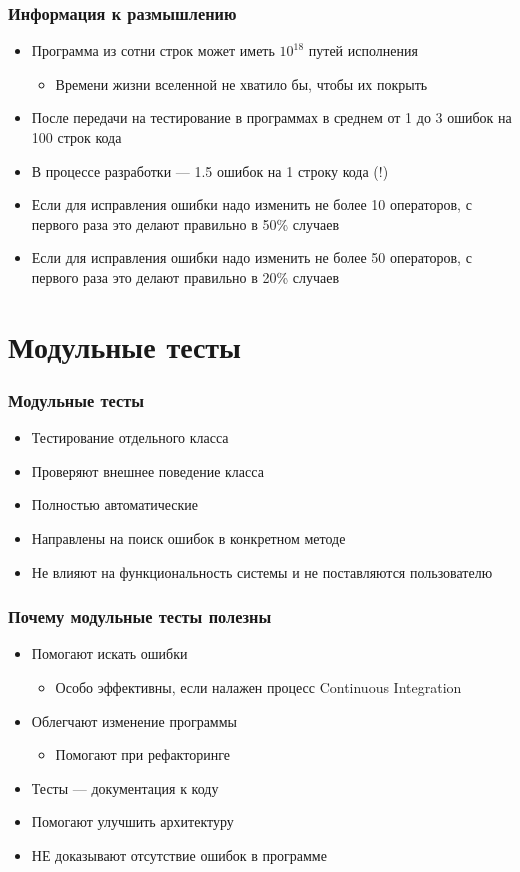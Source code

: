 \documentclass[xetex,mathserif,serif]{beamer}
\begin{document}
	\begin{frame}
		\frametitle{Информация к размышлению}
		\begin{itemize}
			\item Программа из сотни строк может иметь $10^{18}$ путей исполнения
			\begin{itemize}
				\item Времени жизни вселенной не хватило бы, чтобы их покрыть
			\end{itemize}
			\item После передачи на тестирование в программах в среднем от 1 до 3 ошибок на 100 строк кода
			\item В процессе разработки --- 1.5 ошибок на 1 строку кода (!)
			\item Если для исправления ошибки надо изменить не более 10 операторов, с первого раза это делают правильно в 50\% случаев
			\item Если для исправления ошибки надо изменить не более 50 операторов, с первого раза это делают правильно в 20\% случаев
		\end{itemize}
	\end{frame}

	\section{Модульные тесты}

	\begin{frame}
		\frametitle{Модульные тесты}
		\begin{itemize}
			\item Тестирование отдельного класса
			\item Проверяют внешнее поведение класса
			\item Полностью автоматические
			\item Направлены на поиск ошибок в конкретном методе
			\item Не влияют на функциональность системы и не поставляются пользователю
		\end{itemize}
	\end{frame}

	\begin{frame}
		\frametitle{Почему модульные тесты полезны}
		\begin{itemize}
			\item Помогают искать ошибки
			\begin{itemize}
				\item Особо эффективны, если налажен процесс Continuous Integration
			\end{itemize}
			\item Облегчают изменение программы
			\begin{itemize}
				\item Помогают при рефакторинге
			\end{itemize}
			\item Тесты --- документация к коду
			\item Помогают улучшить архитектуру
			\item НЕ доказывают отсутствие ошибок в программе
		\end{itemize}
	\end{frame}
\end{document}

